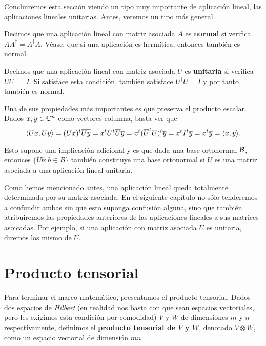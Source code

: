 Concluiremos esta sección viendo un tipo muy importante de aplicación lineal, las aplicaciones lineales unitarias. Antes, veremos un tipo más general.

\begin{definition} Decimos que una aplicación lineal con matriz asociada $A$ es \textbf{normal} si verifica $AA^\dag=A^\dag A$. Véase, que si una aplicación es hermítica, entonces también es normal.
\end{definition}

\begin{definition} Decimos que una aplicación lineal con matriz asociada $U$ es \textbf{unitaria} si verifica $UU^\dag=I$. Si satisface esta condición, también satisface $U^\dag U=I$ y por tanto también es normal.

Una de sus propiedades más importantes es que preserva el producto escalar. Dados $x,y\in\mathbb{C}^n$ como vectores columna, basta ver que
\begin{equation}
\langle Ux,Uy\rangle=(Ux)^t\overline{Uy}=x^t U^t\overline{U}\overline{y}=x^t (\overline{U}^t U)^t\overline{y}=x^t I^t\overline{y}=x^t\overline{y}=\langle x,y\rangle.
\end{equation}

Esto supone una implicación adicional y es que dada una base ortonormal $\mathcal{B}$, entonces $\{Ub: b\in B\}$ también constituye una base ortonormal si $U$ es una matriz asociada a una aplicación lineal unitaria.
\end{definition}

Como hemos mencionado antes, una aplicación lineal queda totalmente determinada por su matriz asociada. En el siguiente capítulo no sólo tenderemos a confundir ambas sin que esto suponga confusión alguna, sino que también atribuiremos las propiedades anteriores de las aplicaciones lineales a sus matrices asoicadas. Por ejemplo, si una aplicación con matriz asociada $U$ es unitaria, diremos los mismo de $U$.

\section{Producto tensorial}

Para terminar el marco matemático, presentamos el producto tensorial. Dados dos espacios de \textit{Hilbert} (en realidad nos basta con que sean espacios vectoriales, pero les exigimos esta condición por comodidad) $V$ y $W$ de dimensiones $m$ y $n$ respectivamente, definimos  el \textbf{producto tensorial de $V$ y $W$}, denotado $V\otimes W$, como un espacio vectorial de dimensión $mn$.

